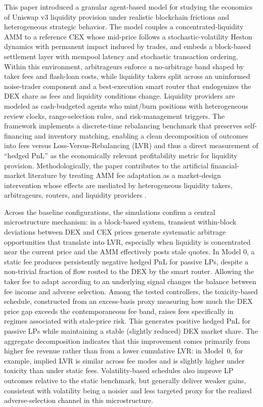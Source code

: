 \documentclass[11pt]{article}
\begin{document}
This paper introduced a granular agent-based model for studying the economics of Uniswap v3 liquidity provision under 
realistic blockchain frictions and heterogeneous strategic behavior. The model couples a concentrated-liquidity AMM to 
a reference CEX whose mid-price follows a stochastic-volatility Heston dynamics with permanent impact induced by trades, 
and embeds a block-based settlement layer with mempool latency and stochastic transaction ordering. Within this 
environment, arbitrageurs enforce a no-arbitrage band shaped by taker fees and flash-loan costs, while liquidity takers 
split across an uninformed noise-trader component and a best-execution smart router that endogenizes the DEX share as 
fees and liquidity conditions change. Liquidity providers are modeled as cash-budgeted agents who mint/burn positions 
with heterogeneous review clocks, range-selection rules, and risk-management triggers. The framework implements a 
discrete-time rebalancing benchmark that preserves self-financing and inventory matching, enabling a clean decomposition 
of outcomes into fees versus Loss-Versus-Rebalancing (LVR) and thus a direct measurement of “hedged PnL” as the 
economically relevant profitability metric for liquidity provision. Methodologically, the paper contributes to the artificial financial-market literature by treating AMM fee adaptation as a market-design intervention whose effects are mediated by heterogeneous liquidity takers, arbitrageurs, routers, and liquidity providers \cite{raberto2001,chakraborti2011,westerhoff2006,mizuta2020}.


Across the baseline configurations, the simulations confirm a central microstructure mechanism: in a block-based system,
transient within-block deviations between DEX and CEX prices generate systematic arbitrage opportunities that translate
into LVR, especially when liquidity is concentrated near the current price and the AMM effectively posts stale quotes.
In Model 0, a static fee produces persistently negative hedged PnL for passive LPs, despite a non-trivial fraction of
flow routed to the DEX by the smart router. Allowing the taker fee to adapt according to an underlying signal changes
the balance between fee income and adverse selection. Among the tested controllers, the toxicity-based schedule,
constructed from an excess-basis proxy measuring how much the DEX price gap exceeds the contemporaneous fee band,
raises fees specifically in regimes associated with stale-price risk. This generates positive hedged PnL for passive LPs
while maintaining a stable (slightly reduced) DEX market share. The aggregate decomposition indicates that this improvement
comes primarily from higher fee revenue rather than from a lower cumulative LVR: in Model~0, for example, implied LVR is
similar across fee modes and is slightly higher under toxicity than under static fees. Volatility-based schedules also
improve LP outcomes relative to the static benchmark, but generally deliver weaker gains, consistent with volatility being
a noisier and less targeted proxy for the realized adverse-selection channel in this microstructure.
\end{document}
